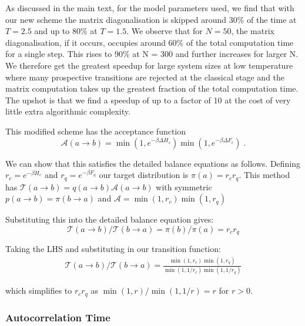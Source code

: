 As discussed in the main text, for the model parameters used, we find that with our new scheme the matrix diagonalisation is skipped around 30\% of the time at \(T = 2.5\) and up to 80\% at \(T = 1.5\). We observe that for \(N = 50\), the matrix diagonalisation, if it occurs, occupies around 60\% of the total computation time for a single step. This rises to 90\% at N = 300 and further increases for larger N. We therefore get the greatest speedup for large system sizes at low temperature where many prospective transitions are rejected at the classical stage and the matrix computation takes up the greatest fraction of the total computation time. The upshot is that we find a speedup of up to a factor of 10 at the cost of very little extra algorithmic complexity.

This modified scheme has the acceptance function \[\mathcal{A}(a \to b) = \min\left(1, e^{-\beta \Delta H_s}\right)\min\left(1, e^{-\beta \Delta F_c}\right)\;.\]

We can show that this satisfies the detailed balance equations as follows. Defining \(r_c = e^{-\beta H_c}\) and \(r_q = e^{-\beta F_q}\) our target distribution is \(\pi(a) = r_c r_q\). This method has \(\mathcal{T}(a\to b) = q(a\to b)\mathcal{A}(a \to b)\) with symmetric \(p(a \to b) = \pi(b \to a)\) and \(\mathcal{A} = \min\left(1, r_c\right) \min\left(1, r_q\right)\)

Substituting this into the detailed balance equation gives: \[\mathcal{T}(a \to b)/\mathcal{T}(b \to a) = \pi(b)/\pi(a) = r_c r_q\]

Taking the LHS and substituting in our transition function: \[\begin{aligned}
\mathcal{T}(a \to b)/\mathcal{T}(b \to a) = \frac{\min\left(1, r_c\right) \min\left(1, r_q\right)}{ \min\left(1, 1/r_c\right) \min\left(1, 1/r_q\right)}\end{aligned}\]

which simplifies to \(r_c r_q\) as \(\min(1,r)/\min(1,1/r) = r\) for \(r > 0\).

\hypertarget{app-mcmc-autocorrelation}{%
\subsubsection{Autocorrelation Time}\label{app-mcmc-autocorrelation}}

